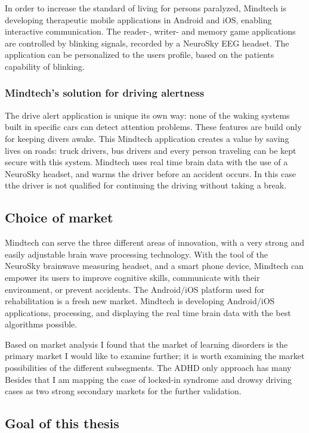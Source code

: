 \documentclass[letterpaper,10pt]{article}
\let\oldsubsection\subsection
\renewcommand{\subsection}{\def\cursectioning{subsection}\oldsubsection}
\begin{document}
In order to increase the standard of living for persons paralyzed, Mindtech is developing therapeutic mobile applications in Android and iOS, enabling interactive communication. The reader-, writer- and memory game applications are controlled by blinking signals, recorded by a NeuroSky EEG headset. 
The application can be personalized to the users profile, based on the patients capability of blinking. 

\subsubsection{Mindtech's solution for driving alertness}

The drive alert application is unique its own way: none of the waking systems built in specific cars can detect attention problems. These features are build only for keeping divers awake. This Mindtech application creates a value by saving lives on roads: truck drivers, bus drivers and every person traveling can be kept secure with this system.
Mindtech uses real time brain data with the use of a NeuroSky headset, and warms the driver before an accident occurs. In this case tthe driver is not qualified for continuing the driving without taking a break.


\subsection{Choice of market}

Mindtech can serve the three different areas of innovation, with a very strong and easily adjustable brain wave processing technology. With the tool of the NeuroSky brainwave measuring headset, and a smart phone device, Mindtech can empower its users to improve cognitive skills, communicate with their environment, or prevent accidents. The Android/iOS platform used for rehabilitation is a fresh new market. Mindtech is developing Android/iOS applications, processing, and displaying the real time brain data with the best algorithms possible. 

Based on market analysis I found that the market of learning disorders is the primary market I would like to examine further; it is worth examining the market possibilities of the different subsegments. The ADHD only approach has many Besides that I am mapping the case of locked-in syndrome and drowsy driving cases as two strong secondary markets for the further validation.


\subsection{Goal of this thesis}
\end{document}
